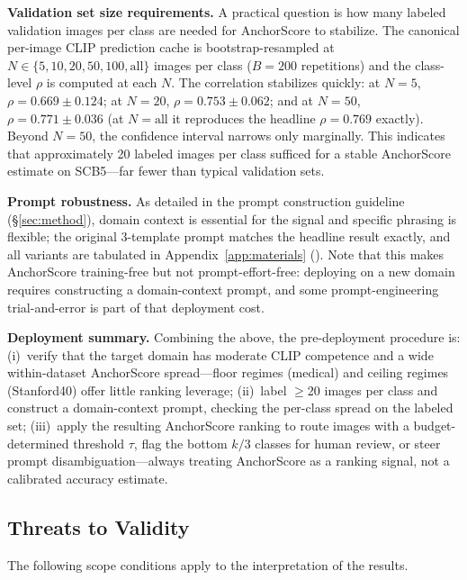 \documentclass[11pt,a4paper]{article}
\begin{document}
\textbf{Validation set size requirements.} A practical question is how many labeled validation images per class are needed for AnchorScore to stabilize. The canonical per-image CLIP prediction cache is bootstrap-resampled at $N\in\{5,10,20,50,100,\text{all}\}$ images per class ($B=200$ repetitions) and the class-level $\rho$ is computed at each $N$. The correlation stabilizes quickly: at $N=5$, $\rho=0.669\pm0.124$; at $N=20$, $\rho=0.753\pm0.062$; and at $N=50$, $\rho=0.771\pm0.036$ (at $N=\text{all}$ it reproduces the headline $\rho=0.769$ exactly). Beyond $N=50$, the confidence interval narrows only marginally. This indicates that approximately 20 labeled images per class sufficed for a stable AnchorScore estimate on SCB5---far fewer than typical validation sets.

\textbf{Prompt robustness.} As detailed in the prompt construction guideline (\S\ref{sec:method}), domain context is essential for the signal and specific phrasing is flexible; the original 3-template prompt matches the headline result exactly, and all variants are tabulated in Appendix~\ref{app:materials} (). Note that this makes AnchorScore training-free but not prompt-effort-free: deploying on a new domain requires constructing a domain-context prompt, and some prompt-engineering trial-and-error is part of that deployment cost.

\textbf{Deployment summary.} Combining the above, the pre-deployment procedure is: (i)~verify that the target domain has moderate CLIP competence and a wide within-dataset AnchorScore spread---floor regimes (medical) and ceiling regimes (Stanford40) offer little ranking leverage; (ii)~label $\geq$20 images per class and construct a domain-context prompt, checking the per-class spread on the labeled set; (iii)~apply the resulting AnchorScore ranking to route images with a budget-determined threshold $\tau$, flag the bottom $k/3$ classes for human review, or steer prompt disambiguation---always treating AnchorScore as a ranking signal, not a calibrated accuracy estimate.

\subsection{Threats to Validity}
\label{sec:limitations}

The following scope conditions apply to the interpretation of the results.
\end{document}
